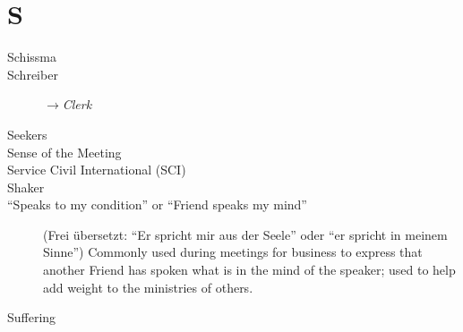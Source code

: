 \section*{S}

\articlesize

\begin{description}
 \item[Schissma]

 \item[Schreiber] $\to$\textit{Clerk}

 \item[Seekers]

 \item[Sense of the Meeting]

 \item[Service Civil International (SCI)]

 \item[Shaker]

 \item["`Speaks to my condition"' or "`Friend speaks my mind"'] (Frei übersetzt: "`Er spricht mir aus der Seele"' oder "`er spricht in meinem Sinne"')
    Commonly used during meetings for business to express that another Friend has spoken what is in the mind of the speaker; used to help add weight to the ministries of others.



 \item[Suffering]

 \end{description}

\normalsize
